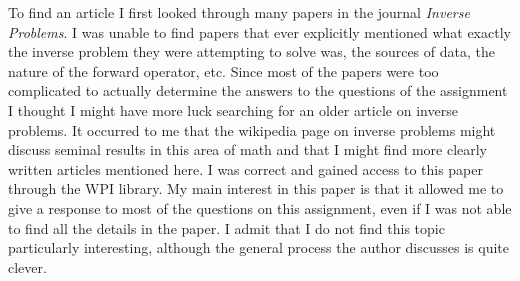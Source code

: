 \documentclass[11pt]{article}
\begin{document}
To find an article I first looked through many papers in the journal \textit{Inverse Problems}. I was unable to find papers that ever explicitly mentioned what exactly the inverse problem they were attempting to solve was, the sources of data, the nature of the forward operator, etc. Since most of the papers were too complicated to actually determine the answers to the questions of the assignment I thought I might have more luck searching for an older article on inverse problems. It occurred to me that the wikipedia page on inverse problems might discuss seminal results in this area of math and that I might find more clearly written articles mentioned here. I was correct and gained access to this paper through the WPI library. My main interest in this paper is that it allowed me to give a response to most of the questions on this assignment, even if I was not able to find all the details in the paper. I admit that I do not find this topic particularly interesting, although the general process the author discusses is quite clever. 
\end{document}
